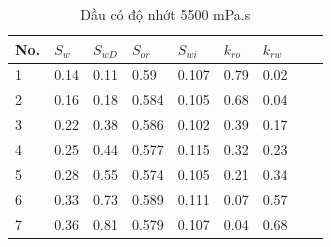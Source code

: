 \documentclass[12pt,a4paper]{article}
\begin{document}
\begin{table}[h]
\centering
\caption{Dầu có độ nhớt 5500 mPa.s}
\label{my-label}
\begin{tabularx}{\textwidth}{@{}XXXXXXXXX@{}}
\toprule
No. & $S_w$ & $S_{wD}$ & $S_{or}$ & $S_{wi}$ & $k_{ro}$ & $k_{rw}$ \\ \midrule
1   & 0.14  & 0.11     & 0.59     & 0.107    & 0.79     & 0.02     \\
2   & 0.16  & 0.18     & 0.584    & 0.105    & 0.68     & 0.04     \\
3   & 0.22  & 0.38     & 0.586    & 0.102    & 0.39     & 0.17     \\
4   & 0.25  & 0.44     & 0.577    & 0.115    & 0.32     & 0.23     \\
5   & 0.28  & 0.55     & 0.574    & 0.105    & 0.21     & 0.34     \\
6   & 0.33  & 0.73     & 0.589    & 0.111    & 0.07     & 0.57     \\
7   & 0.36  & 0.81     & 0.579    & 0.107    & 0.04     & 0.68     \\ \bottomrule
\end{tabularx}
\end{table}
	\clearpage
\end{document}
